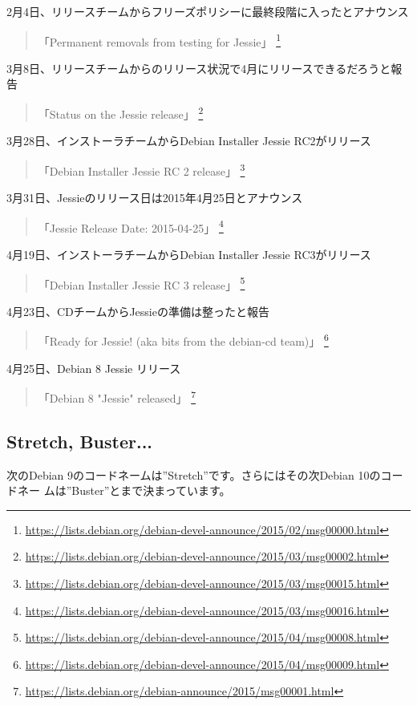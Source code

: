 \documentclass[mingoth,a4paper]{jsarticle}
\begin{document}
2月4日、リリースチームからフリーズポリシーに最終段階に入ったとアナウンス
\begin{quote}
  「Permanent removals from testing for Jessie」
  \footnote{\url{https://lists.debian.org/debian-devel-announce/2015/02/msg00000.html}}
\end{quote}

3月8日、リリースチームからのリリース状況で4月にリリースできるだろうと報告
\begin{quote}
  「Status on the Jessie release」
  \footnote{\url{https://lists.debian.org/debian-devel-announce/2015/03/msg00002.html}}
\end{quote}

3月28日、インストーラチームからDebian Installer Jessie RC2がリリース
\begin{quote}
  「Debian Installer Jessie RC 2 release」
  \footnote{\url{https://lists.debian.org/debian-devel-announce/2015/03/msg00015.html}}
\end{quote}

3月31日、Jessieのリリース日は2015年4月25日とアナウンス
\begin{quote}
  「Jessie Release Date: 2015-04-25」
  \footnote{\url{https://lists.debian.org/debian-devel-announce/2015/03/msg00016.html}}
\end{quote}

4月19日、インストーラチームからDebian Installer Jessie RC3がリリース
\begin{quote}
  「Debian Installer Jessie RC 3 release」
  \footnote{\url{https://lists.debian.org/debian-devel-announce/2015/04/msg00008.html}}
\end{quote}

4月23日、CDチームからJessieの準備は整ったと報告
\begin{quote}
  「Ready for Jessie! (aka bits from the debian-cd team)」
  \footnote{\url{https://lists.debian.org/debian-devel-announce/2015/04/msg00009.html}}
\end{quote}

4月25日、Debian 8 Jessie リリース
\begin{quote}
  「Debian 8 "Jessie" released」
  \footnote{\url{https://lists.debian.org/debian-announce/2015/msg00001.html}}
\end{quote}

\subsection{Stretch, Buster...}

次のDebian 9のコードネームは''Stretch''です。さらにはその次Debian 10のコードネー
ムは''Buster''とまで決まっています。
\end{document}
